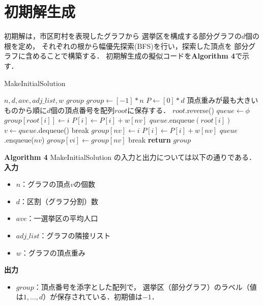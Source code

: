\section{初期解生成} \label{section:4.2}

初期解は，市区町村を表現したグラフから
選挙区を構成する部分グラフの$d$個の根を定め，
それぞれの根から幅優先探索(BFS)を行い，探索した頂点を
部分グラフに含めることで構築する．
初期解生成の擬似コードを\textbf{Algorithm 4}で示す．

\begin{breakablealgorithm}
  \caption{MakeInitialSolution}
  \label{make_initial_solution}
  \begin{algorithmic}[1]
    \Require $n, d, ave, adj\_list, w$
    \Ensure $group$
    \State $group \gets [-1] * n$
    \State $P \gets [0] * d$
    \State 頂点重みが最も大きいものから順に$d$個の頂点番号を配列$root$に保存する．
    \State $root$.reverse()
      \State $queue \gets \phi $
      \State $group[root[i]] \gets i$
      \State $P[i] \gets P[i] + w[nv]$
      \State $queue$.enqueue$(root[i])$
        \State $v \gets queue$.dequeue()
            \State break
            \State $group[nv] \gets i$
            \State $P[i] \gets P[i] + w[nv]$
            \State $queue$.enqueue($nv$)
          \EndIf
        \EndFor
      \EndWhile
    \EndFor
              \State $group[vi] \gets group[nv]$
              \State break
            \EndIf
          \EndFor
        \EndIf
      \EndFor
    \EndWhile
    \State \textbf{return }$group$
  \end{algorithmic}
\end{breakablealgorithm}

\textbf{Algorithm 4} MakeInitialSolution の入力と出力については以下の通りである．\\
\textbf{入力}
\begin{itemize}
  \item $n$：グラフの頂点$v$の個数
  \item $d$：区割（グラフ分割）数
  \item $ave$：一選挙区の平均人口
  \item $adj\_list$：グラフの隣接リスト
  \item $w$：グラフの頂点重み
\end{itemize}
\textbf{出力}
\begin{itemize}
  \item $group$：頂点番号を添字とした配列で，
    選挙区（部分グラフ）のラベル（値は$1,\ldots,d$）が保存されている．初期値は$-1$．
\end{itemize}

